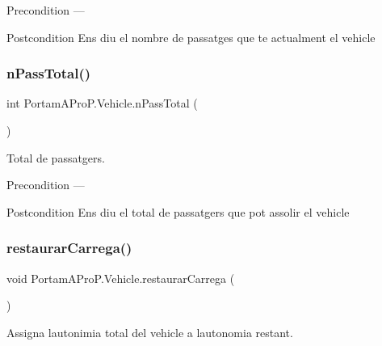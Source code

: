 \begin{DoxyPrecond}{Precondition}
--- 
\end{DoxyPrecond}
\begin{DoxyPostcond}{Postcondition}
Ens diu el nombre de passatges que te actualment el vehicle 
\end{DoxyPostcond}
\mbox{\label{class_portam_a_pro_p_1_1_vehicle_adec927d972606ab6d3fcdfa113b46ce3}} 
\subsubsection{\texorpdfstring{n\+Pass\+Total()}{nPassTotal()}}
{\footnotesize\ttfamily int Portam\+A\+Pro\+P.\+Vehicle.\+n\+Pass\+Total (\begin{DoxyParamCaption}{ }\end{DoxyParamCaption})}



Total de passatgers. 

\begin{DoxyPrecond}{Precondition}
--- 
\end{DoxyPrecond}
\begin{DoxyPostcond}{Postcondition}
Ens diu el total de passatgers que pot assolir el vehicle 
\end{DoxyPostcond}
\mbox{\label{class_portam_a_pro_p_1_1_vehicle_a2d2bd58e6b614ff9cbbf4229cdc19e8e}} 
\subsubsection{\texorpdfstring{restaurar\+Carrega()}{restaurarCarrega()}}
{\footnotesize\ttfamily void Portam\+A\+Pro\+P.\+Vehicle.\+restaurar\+Carrega (\begin{DoxyParamCaption}{ }\end{DoxyParamCaption})}



Assigna l\textquotesingle{}autonimia total del vehicle a l\textquotesingle{}autonomia restant. 

